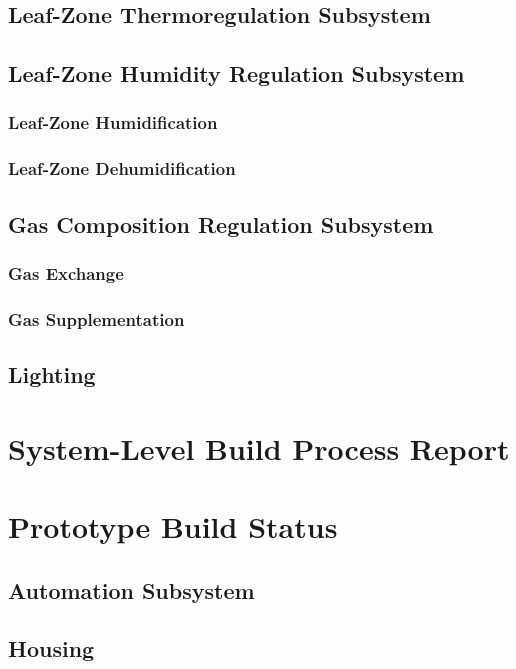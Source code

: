 \documentclass{report}
\begin{document}
\subsection{Leaf-Zone Thermoregulation Subsystem}
\subsection{Leaf-Zone Humidity Regulation Subsystem}
\subsubsection{Leaf-Zone Humidification}
\subsubsection{Leaf-Zone Dehumidification}
\subsection{Gas Composition Regulation Subsystem}
\subsubsection{Gas Exchange}
\subsubsection{Gas Supplementation}
\subsection{Lighting}



\section{System-Level Build Process Report}



\section{Prototype Build Status}
\subsection{Automation Subsystem}
\subsection{Housing}
\end{document}
